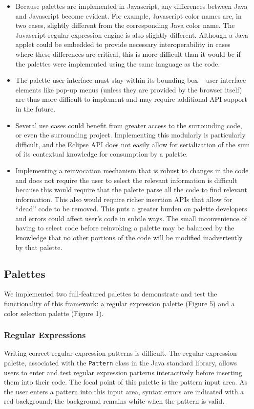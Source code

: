 \documentclass[10pt, conference, compsocconf]{IEEEtran}
\begin{document}
\begin{itemize}
\item Because palettes are implemented in Javascript, any differences between Java and Javascript become evident. For example, Javascript color names are, in two cases, slightly different from the corresponding Java color name. The Javascript regular expression engine is also slightly different. Although a Java applet could be embedded to provide necessary interoperability in cases where these differences are critical, this is more difficult than it would be if the palettes were implemented using the same language as the code.
\item The palette user interface must stay within its bounding box -- user interface elements like pop-up menus (unless they are provided by the browser itself) are thus more difficult to implement and may require additional API support in the future.
\item Several use cases could benefit from greater access to the surrounding code, or even the surrounding project. Implementing this modularly is particularly difficult, and the Eclipse API does not easily allow for  serialization of the sum of its contextual knowledge for consumption by a palette.
\item Implementing a reinvocation mechanism that is robust to changes in the code and does not require the user to select the relevant information is difficult because this would require that the palette  parse all the code to find relevant information. This also would require richer insertion APIs that allow for  ``dead'' code to be removed. This puts a greater burden on palette developers and errors could affect user's code in subtle ways. The small inconvenience of having to select code before reinvoking a palette may be balanced by the knowledge that no other portions of the code will be modified inadvertently by that palette.
\end{itemize}

\subsection{Palettes}
We implemented two full-featured palettes to demonstrate and test the functionality of this framework: a regular expression palette (Figure 5) and a color selection palette (Figure 1).

\subsubsection{Regular Expressions}
Writing correct regular expression patterns is difficult. The regular expression palette, associated with the \verb|Pattern| class in the Java standard library, allows users to enter and test regular expression patterns interactively before inserting them into their code.  The focal point of this palette is the pattern input area. As the user enters a pattern into this input area, syntax errors are indicated with a red background; the background remains white when the pattern is valid.
\end{document}
